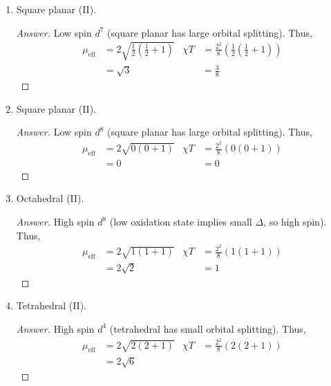 \documentclass[../psets.tex]{subfiles}
\begin{document}
\begin{enumerate}
\begin{enumerate}[label={\alph*)}]
\begin{proof}[Answer]
\begin{align*}
                &= \sqrt{3}&
                    &= \frac{3}{8}
            \end{align*}
        \end{proof}
        \item Square planar (II).
        \begin{proof}[Answer]
            Low spin $d^7$ (square planar has large orbital splitting). Thus,
            \begin{align*}
                \mu_\text{eff} &= 2\sqrt{\frac{1}{2}\left( \frac{1}{2}+1 \right)}&
                    \chi T &= \frac{2^2}{8}\left( \frac{1}{2}\left( \frac{1}{2}+1 \right) \right)\\
                &= \sqrt{3}&
                    &= \frac{3}{8}
            \end{align*}
        \end{proof}
        \newpage
        \item Square planar (II).
        \begin{proof}[Answer]
            Low spin $d^8$ (square planar has large orbital splitting). Thus,
            \begin{align*}
                \mu_\text{eff} &= 2\sqrt{0(0+1)}&
                    \chi T &= \frac{2^2}{8}(0(0+1))\\
                &= 0&
                    &= 0
            \end{align*}
        \end{proof}
        \item Octahedral (II).
        \begin{proof}[Answer]
            High spin $d^8$ (low oxidation state implies small $\Delta$, so high spin). Thus,
            \begin{align*}
                \mu_\text{eff} &= 2\sqrt{1(1+1)}&
                    \chi T &= \frac{2^2}{8}(1(1+1))\\
                &= 2\sqrt{2}&
                    &= 1
            \end{align*}
        \end{proof}
        \item Tetrahedral (II).
        \begin{proof}[Answer]
            High spin $d^4$ (tetrahedral has small orbital splitting). Thus,
            \begin{align*}
                \mu_\text{eff} &= 2\sqrt{2(2+1)}&
                    \chi T &= \frac{2^2}{8}(2(2+1))\\
                &= 2\sqrt{6}&

\end{align*}
\end{proof}
\end{enumerate}
\end{enumerate}
\end{document}
